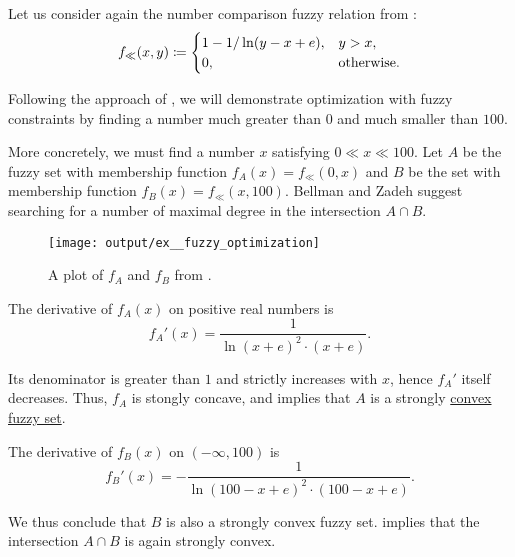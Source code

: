 \begin{example}\label{ex:fuzzy_optimization}
  Let us consider again the number comparison fuzzy relation from :
  \begin{equation*}
    f_\ll(x, y) \coloneqq \begin{cases}
      1 - 1 / \ln(y - x + e), &y > x, \\
      0,                      &\T{otherwise.}
    \end{cases}
  \end{equation*}

  Following the approach of , we will demonstrate optimization with fuzzy constraints by finding a number much greater than \( 0 \) and much smaller than \( 100 \).

  More concretely, we must find a number \( x \) satisfying \( 0 \ll x \ll 100 \). Let \( A \) be the fuzzy set with membership function \( f_A(x) = f_\ll(0, x) \) and \( B \) be the set with membership function \( f_B(x) = f_\ll(x, 100) \). Bellman and Zadeh suggest searching for a number of maximal degree in the intersection \( A \cap B \).

  \begin{figure}[!ht]
    \centering
    \texttt{[image: output/ex\_\_fuzzy\_optimization]}
    \caption{A plot of \( f_A \) and \( f_B \) from .}\label{fig:ex:fuzzy_optimization}
  \end{figure}

  The derivative of \( f_A(x) \) on positive real numbers is
  \begin{equation*}
    f_A'(x) = \frac 1 {\ln(x + e)^2 \cdot (x + e)}.
  \end{equation*}

  Its denominator is greater than \( 1 \) and strictly increases with \( x \), hence \( f_A' \) itself decreases. Thus, \( f_A \) is stongly concave, and  implies that \( A \) is a strongly \hyperref[def:convex_fuzzy_set]{convex fuzzy set}.

  The derivative of \( f_B(x) \) on \( (-\infty, 100) \) is
  \begin{equation*}
    f_B'(x) = -\frac 1 {\ln(100 - x + e)^2 \cdot (100 - x + e)}.
  \end{equation*}

  We thus conclude that \( B \) is also a strongly convex fuzzy set.  implies that the intersection \( A \cap B \) is again strongly convex.


\end{example}

